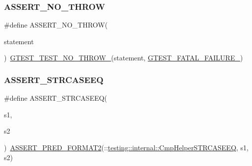 \mbox{\label{googletest-master_2googletest_2include_2gtest_2gtest_8h_a895c34d9b192cdc2ba46d2680623485d}} 
\subsubsection{\texorpdfstring{ASSERT\_NO\_THROW}{ASSERT\_NO\_THROW}}
{\footnotesize\ttfamily \#define A\+S\+S\+E\+R\+T\+\_\+\+N\+O\+\_\+\+T\+H\+R\+OW(\begin{DoxyParamCaption}\item[{}]{statement }\end{DoxyParamCaption})~\mbox{\hyperlink{_obj__test_2lib_2googletest-release-1_88_81_2googletest_2include_2gtest_2internal_2gtest-internal_8h_a9a109d026b5a904646437d7570e13581}{G\+T\+E\+S\+T\+\_\+\+T\+E\+S\+T\+\_\+\+N\+O\+\_\+\+T\+H\+R\+O\+W\+\_\+}}(statement, \mbox{\hyperlink{_obj__test_2lib_2googletest-release-1_88_81_2googletest_2include_2gtest_2internal_2gtest-internal_8h_a0f9a4c3ea82cc7bf4478eaffdc168358}{G\+T\+E\+S\+T\+\_\+\+F\+A\+T\+A\+L\+\_\+\+F\+A\+I\+L\+U\+R\+E\+\_\+}})}

\mbox{\label{googletest-master_2googletest_2include_2gtest_2gtest_8h_a58847dd696200a3268361401dfcd0fa0}} 
\subsubsection{\texorpdfstring{ASSERT\_STRCASEEQ}{ASSERT\_STRCASEEQ}}
{\footnotesize\ttfamily \#define A\+S\+S\+E\+R\+T\+\_\+\+S\+T\+R\+C\+A\+S\+E\+EQ(\begin{DoxyParamCaption}\item[{}]{s1,  }\item[{}]{s2 }\end{DoxyParamCaption})~\mbox{\hyperlink{_obj__test_2lib_2googletest-release-1_88_81_2googletest_2include_2gtest_2gtest__pred__impl_8h_ac452685a1a98ea3d96eb956a062ee210}{A\+S\+S\+E\+R\+T\+\_\+\+P\+R\+E\+D\+\_\+\+F\+O\+R\+M\+A\+T2}}(\+::\mbox{\hyperlink{namespacetesting_1_1internal_a30dfeb01f1bc8087c7d05205d5fa75c1}{testing\+::internal\+::\+Cmp\+Helper\+S\+T\+R\+C\+A\+S\+E\+EQ}}, s1, s2)}

